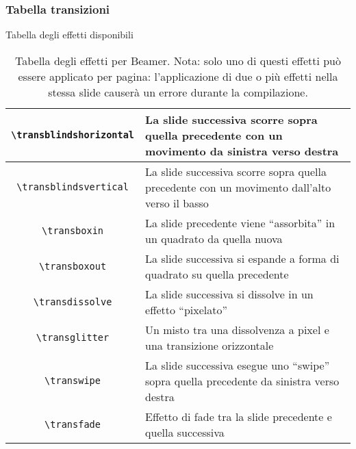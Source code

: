 \begin{frame}[allowframebreaks]
  \frametitle{Tabella transizioni}
  
  Tabella degli effetti disponibili
 


\begin{table}[t]
\centering
\begin{xtabular}{|c|p{5cm}|}
\hline

\texttt{\textbackslash transblindshorizontal} & La slide successiva scorre 
sopra quella precedente con un movimento da sinistra verso destra \\ \hline
\texttt{\textbackslash transblindsvertical}   & La slide successiva scorre 
sopra quella precedente con un movimento dall'alto verso il basso \\ \hline
\texttt{\textbackslash transboxin}            & La slide precedente viene 
``assorbita'' in un quadrato da quella nuova                       \\ \hline
\texttt{\textbackslash transboxout}           & La slide successiva si espande 
a forma di quadrato su quella precedente                      \\ \hline
\texttt{\textbackslash transdissolve}         & La slide successiva si dissolve 
in un effetto ``pixelato''                                   \\ \hline
\texttt{\textbackslash transglitter}          & Un misto tra una dissolvenza a 
pixel e una transizione orizzontale                           \\ \hline
\texttt{\textbackslash transwipe}             & La slide successiva esegue uno 
``swipe'' sopra quella precedente da sinistra verso destra    \\ \hline
\texttt{\textbackslash transfade}             & Effetto di fade tra la slide 
precedente e quella successiva                                  \\ \hline
\end{xtabular}
\caption[Tabella degli effetti Beamer]{Tabella degli effetti per Beamer. Nota:
solo uno di questi effetti può essere applicato per pagina: l'applicazione di
due o più effetti nella stessa slide causerà un errore durante la compilazione.}
\label{tab:beamer_effects}
\end{table}
\end{frame}
